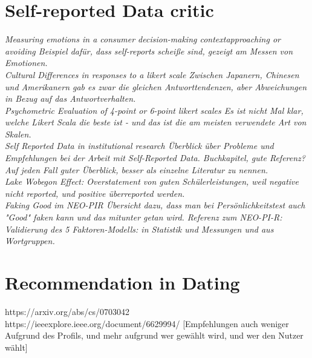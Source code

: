\documentclass[nochapterpage,bigchapter,linedtoc,longdoc,colorback,accentcolor=tud3b]{tudreport}
\begin{document}
\section{Self-reported Data critic}
\textit{Measuring emotions in a consumer decision-making contextapproaching or avoiding \cite{sorensen2008measuring}
Beispiel dafür, dass self-reports scheiße sind, gezeigt am Messen von Emotionen.}\\

\textit{Cultural Differences in responses to a likert scale \cite{lee2002cultural}
Zwischen Japanern, Chinesen und Amerikanern gab es zwar die gleichen Antworttendenzen, aber Abweichungen in Bezug auf das Antwortverhalten.}\\

\textit{Psychometric Evaluation of 4-point or 6-point likert scales \cite{chang1994psychometric}
Es ist nicht Mal klar, welche Likert Scala die beste ist - und das ist die am meisten verwendete Art von Skalen.}\\

\textit{Self Reported Data in institutional research \cite{gonyea2005self}
Überblick über Probleme und Empfehlungen bei der Arbeit mit Self-Reported Data. Buchkapitel, gute Referenz? Auf jeden Fall guter Überblick, besser als einzelne Literatur zu nennen.}\\

\textit{Lake Wobegon Effect: Overstatement von guten Schülerleistungen, weil negative nicht reported, und positive überreported werden. \cite{maxwell1994lake}}\\

\textit{Faking Good im NEO-PIR \cite{griffin2004applicants}
Übersicht dazu, dass man bei Persönlichkeitstest auch "Good" faken kann und das mitunter getan wird. Referenz zum NEO-PI-R: \cite{ostendorf2004neo}}\\
\textit{Validierung des 5 Faktoren-Modells: \cite{mccrae1987validation} in Statistik und Messungen und \cite{goldberg1990alternative} aus Wortgruppen.}\\

\section{Recommendation in Dating}
https://arxiv.org/abs/cs/0703042\\

https://ieeexplore.ieee.org/document/6629994/ [Empfehlungen auch weniger Aufgrund des Profils, und mehr aufgrund wer gewählt wird, und wer den Nutzer wählt]\\
\end{document}
